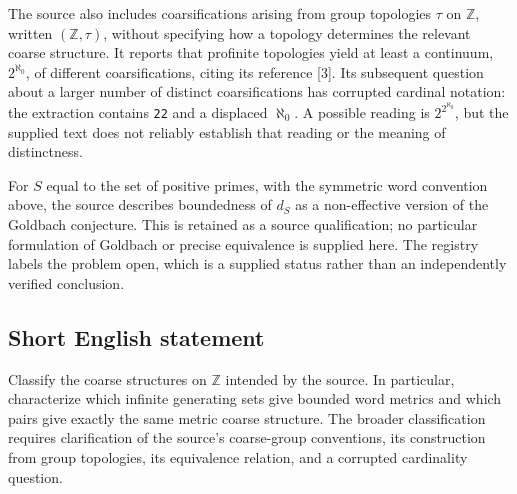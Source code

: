 \documentclass[11pt]{article}
\newcommand{\Z}{\mathbb{Z}}
\begin{document}
The source also includes coarsifications arising from group topologies \(\tau\) on \(\Z\), written \((\Z,\tau)\), without specifying how a topology determines the relevant coarse structure. It reports that profinite topologies yield at least a continuum, \(2^{\aleph_0}\), of different coarsifications, citing its reference [3]. Its subsequent question about a larger number of distinct coarsifications has corrupted cardinal notation: the extraction contains \texttt{22} and a displaced \(\aleph_0\). A possible reading is \(2^{2^{\aleph_0}}\), but the supplied text does not reliably establish that reading or the meaning of distinctness.

For \(S\) equal to the set of positive primes, with the symmetric word convention above, the source describes boundedness of \(d_S\) as a non-effective version of the Goldbach conjecture. This is retained as a source qualification; no particular formulation of Goldbach or precise equivalence is supplied here. The registry labels the problem open, which is a supplied status rather than an independently verified conclusion.
\subsection{Short English statement}
Classify the coarse structures on \(\Z\) intended by the source. In particular, characterize which infinite generating sets give bounded word metrics and which pairs give exactly the same metric coarse structure. The broader classification requires clarification of the source's coarse-group conventions, its construction from group topologies, its equivalence relation, and a corrupted cardinality question.
\end{document}
